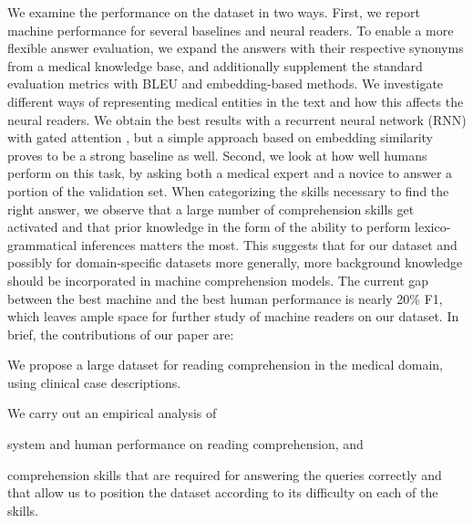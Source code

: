 \documentclass[11pt,a4paper]{article}
\begin{document}
We examine the performance on the dataset in two ways. First, we report machine performance for several baselines and neural readers. To enable a more flexible answer evaluation, we expand the answers with their respective synonyms from a medical knowledge base, and additionally supplement the standard evaluation metrics with BLEU and embedding-based methods. We investigate different ways of representing medical entities in the text and how this affects the neural readers. We obtain the best results with a recurrent neural network (RNN) with gated attention \citep{DhingraEtAl2017a}, but a simple approach based on embedding similarity proves to be a strong baseline as well. Second, we look at how well humans perform on this task, by asking both a medical expert and a novice to answer a portion of the validation set. When categorizing the skills necessary to find the right answer, we observe that a large number of comprehension skills get activated and that prior knowledge in the form of the ability to perform lexico-grammatical inferences matters the most. This suggests that for our dataset and possibly for domain-specific datasets more generally, more background knowledge should be incorporated in machine comprehension models. The current gap between the best machine and the best human performance is nearly 20\% F1, which leaves ample space for further study of machine readers on our dataset. In brief, the contributions of our paper are:
\begin{compactitem}
\item We propose a large dataset for reading comprehension in the medical domain, using clinical case descriptions.
\item We carry out an empirical analysis of \begin{inparaenum} \item system and human performance on reading comprehension, and \item comprehension skills that are required for answering the queries correctly and that allow us to position the dataset according to its difficulty on each of the skills.\end{inparaenum}
\end{compactitem}
\end{document}
